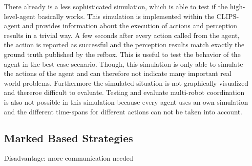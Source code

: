 There already is a less sophisticated simulation, which is able to test if the high-level-agent basically works. This simulation is implemented within the CLIPS-agent and provides information about the execution of actions and perception results in a trivial way. A few seconds after every action called from the agent, the action is reported as successful and the perception results match exactly the ground truth published by the refbox. This is useful to test the behavior of the agent in the best-case scenario. Though, this simulation is only able to simulate the actions of the agent and can therefore not indicate many important real world problems. Furthermore the simulated situation is not graphically visualized and thereroe difficult to evaluate. Testing and evaluate multi-robot coordination is also not possible in this simulation because every agent uses an own simulation and the different time-spans for different actions can not be taken into account.

\subsection{Marked Based Strategies}

Disadvantage: more communication needed
